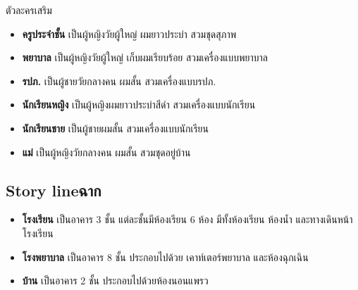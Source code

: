\subitem ตัวละครเสริม
\begin{itemize}
    \item \textbf{ครูประจำชั้น} เป็นผู้หญิงวัยผู้ใหญ่  ผมยาวประบ่า สวมชุดสุภาพ
    \item \textbf{พยาบาล} เป็นผู้หญิงวัยผู้ใหญ่ เก็บผมเรียบร้อย สวมเครื่องแบบพยาบาล
    \item \textbf{รปภ.} เป็นผู้ชายวัยกลางคน ผมสั้น สวมเครื่องแบบรปภ.
    \item \textbf{นักเรียนหญิง} เป็นผู้หญิงผมยาวประบ่าสีดำ สวมเครื่องแบบนักเรียน
    \item \textbf{นักเรียนชาย} เป็นผู้ชายผมสั้น  สวมเครื่องแบบนักเรียน
    \item \textbf{แม่} เป็นผู้หญิงวัยกลางคน ผมสั้น สวมชุดอยู่บ้าน
\end{itemize}

\subsection{\ifenglish Story line\else ฉาก\fi }
\begin{itemize}
    \item \textbf{โรงเรียน} เป็นอาคาร 3 ชั้น แต่ละชั้นมีห้องเรียน 6 ห้อง มีทั้งห้องเรียน ห้องน้ำ และทางเดินหน้าโรงเรียน
    \item \textbf{โรงพยาบาล} เป็นอาคาร 8 ชั้น ประกอบไปด้วย เคาท์เตอร์พยาบาล และห้องฉุกเฉิน
    \item \textbf{บ้าน} เป็นอาคาร 2 ชั้น ประกอบไปด้วยห้องนอนแพรว
\end{itemize}


